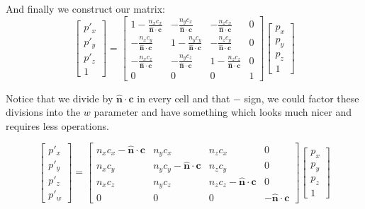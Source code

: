 \documentclass[]{report}   %
\begin{document}
And finally we construct our matrix:
\[
	\begin{bmatrix}
	p\prime_x \\
	p\prime_y \\
	p\prime_z \\
	1
	\end{bmatrix}
	=	
	\begin{bmatrix}
			1 - \frac{n_x c_x}{\mathbf{\hat{n}}\cdot\mathbf{c}}	
		&	- \frac{n_y c_x}{\mathbf{\hat{n}}\cdot\mathbf{c}}	
		&	- \frac{n_z c_x}{\mathbf{\hat{n}}\cdot\mathbf{c}}
		&	0
		\\
			- \frac{n_x c_y}{\mathbf{\hat{n}}\cdot\mathbf{c}}
		&	1 - \frac{n_y c_y}{\mathbf{\hat{n}}\cdot\mathbf{c}}
		&	- \frac{n_z c_y}{\mathbf{\hat{n}}\cdot\mathbf{c}}
		&	0
		\\
			- \frac{n_x c_z}{\mathbf{\hat{n}}\cdot\mathbf{c}}
		&	- \frac{n_y c_z}{\mathbf{\hat{n}}\cdot\mathbf{c}}
		&	1 - \frac{n_z c_z}{\mathbf{\hat{n}}\cdot\mathbf{c}}
		&	0
		\\
		0 & 0 & 0 & 1
	\end{bmatrix}
	\begin{bmatrix}
		p_x \\
		p_y \\
		p_z \\
		1
	\end{bmatrix}
\]

Notice that we divide by \(\mathbf{\hat{n}}\cdot\mathbf{c}\) in every cell and that \(-\) sign, we could factor these divisions into the \(w\) parameter and have something which looks much nicer and requires less operations.

\[
	\begin{bmatrix}
	p\prime_x \\
	p\prime_y \\
	p\prime_z \\
	p\prime_w
	\end{bmatrix}
	=	
	\begin{bmatrix}
			n_x c_x - \mathbf{\hat{n}}\cdot\mathbf{c}	
		&	n_y c_x
		&	n_z c_x
		&	0
		\\
			n_x c_y
		&	n_y c_y - \mathbf{\hat{n}}\cdot\mathbf{c}
		&	n_z c_y
		&	0
		\\
			n_x c_z
		&	n_y c_z
		&	n_z c_z - \mathbf{\hat{n}}\cdot\mathbf{c}
		&	0
		\\
		0 & 0 & 0 & -\mathbf{\hat{n}}\cdot\mathbf{c}
	\end{bmatrix}
	\begin{bmatrix}
		p_x \\
		p_y \\
		p_z \\
		1
	\end{bmatrix}
\]
\end{document}
